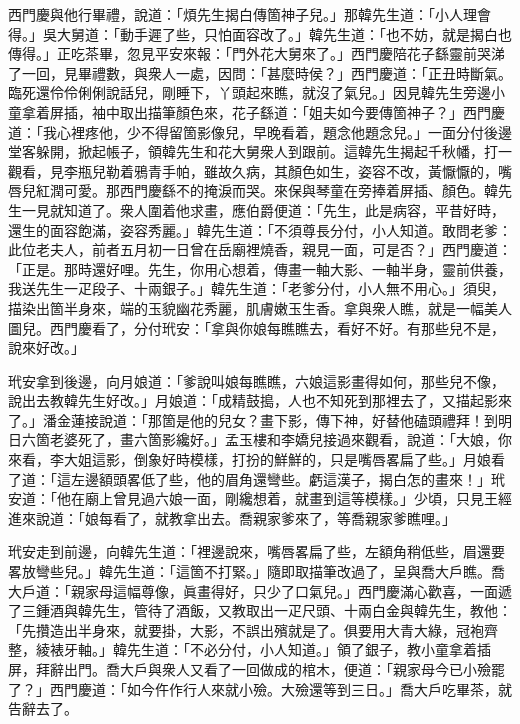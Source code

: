 西門慶與他行畢禮，說道：「煩先生揭白傳箇神子兒。」那韓先生道：「小人理會得。」吳大舅道：「動手遲了些，只怕面容改了。」韓先生道：「也不妨，就是揭白也傳得。」正吃茶畢，忽見平安來報：「門外花大舅來了。」西門慶陪花子繇靈前哭涕了一回，見畢禮數，與衆人一處，因問：「甚麼時侯？」西門慶道：「正丑時斷氣。臨死還伶伶俐俐說話兒，剛睡下，丫頭起來瞧，就沒了氣兒。」因見韓先生旁邊小童拿着屏插，袖中取出描筆顏色來，花子繇道：「姐夫如今要傳箇神子？」西門慶道：「我心裡疼他，少不得留箇影像兒，早晚看着，題念他題念兒。」一面分付後邊堂客躲開，掀起帳子，領韓先生和花大舅衆人到跟前。這韓先生揭起千秋幡，打一觀看，見李瓶兒勒着鴉青手帕，雖故久病，其顏色如生，姿容不改，黃懨懨的，嘴唇兒紅潤可愛。那西門慶繇不的掩淚而哭。來保與琴童在旁捧着屏插、顏色。韓先生一見就知道了。衆人圍着他求畫，應伯爵便道：「先生，此是病容，平昔好時，還生的面容飽滿，姿容秀麗。」{}韓先生道：「不須尊長分付，小人知道。敢問老爹：此位老夫人，前者五月初一日曾在岳廟裡燒香，親見一面，可是否？」{}西門慶道：「正是。那時還好哩。先生，你用心想着，傳畫一軸大影、一軸半身，靈前供養，我送先生一疋段子、十兩銀子。」韓先生道：「老爹分付，小人無不用心。」須臾，描染出箇半身來，端的玉貌幽花秀麗，肌膚嫩玉生香。拿與衆人瞧，就是一幅美人圖兒。西門慶看了，分付玳安：「拿與你娘每瞧瞧去，看好不好。有那些兒不是，說來好改。」

玳安拿到後邊，向月娘道：「爹說叫娘每瞧瞧，六娘這影畫得如何，那些兒不像，說出去教韓先生好改。」月娘道：「成精鼓搗，人也不知死到那裡去了，又描起影來了。」潘金蓮接說道：「那箇是他的兒女？畫下影，傳下神，好替他磕頭禮拜！到明日六箇老婆死了，畫六箇影纔好。」孟玉樓和李嬌兒接過來觀看，說道：「大娘，你來看，李大姐這影，倒象好時模樣，打扮的鮮鮮的，只是嘴唇畧扁了些。」月娘看了道：「這左邊額頭畧低了些，他的眉角還彎些。虧這漢子，揭白怎的畫來！」玳安道：「他在廟上曾見過六娘一面，剛纔想着，就畫到這等模樣。」少頃，只見王經進來說道：「娘每看了，就教拿出去。喬親家爹來了，等喬親家爹瞧哩。」

玳安走到前邊，向韓先生道：「裡邊說來，嘴唇畧扁了些，左額角稍低些，眉還要畧放彎些兒。」韓先生道：「這箇不打緊。」隨即取描筆改過了，呈與喬大戶瞧。喬大戶道：「親家母這幅尊像，眞畫得好，只少了口氣兒。」西門慶滿心歡喜，一面遞了三鍾酒與韓先生，管待了酒飯，又教取出一疋尺頭、十兩白金與韓先生，教他：「先攢造出半身來，就要掛，大影，不誤出殯就是了。俱要用大青大綠，冠袍齊整，綾裱牙軸。」韓先生道：「不必分付，小人知道。」領了銀子，教小童拿着插屏，拜辭出門。喬大戶與衆人又看了一回做成的棺木，便道：「親家母今已小殮罷了？」西門慶道：「如今仵作行人來就小殮。大殮還等到三日。」喬大戶吃畢茶，就告辭去了。

